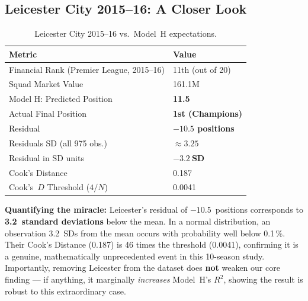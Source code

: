 \documentclass[11pt, a4paper]{article}
\begin{document}
\subsection{Leicester City 2015--16: A Closer Look}

\begin{table}[H]
  \centering
  \small
  \caption{Leicester City 2015--16 vs.\ Model~H expectations.}
  \label{tab:leicester}
  \begin{tabular}{l l}
    \toprule
    \rowcolor{NavyBlue}
    \color{white}\textbf{Metric} &
    \color{white}\textbf{Value} \\
    \midrule
    Financial Rank (Premier League, 2015--16)   & 11th (out of 20) \\
    Squad Market Value                           & \EUR{}161.1M \\
    \rowcolor{RowA}
    Model H: Predicted Position                 & \textbf{11.5} \\
    Actual Final Position                       & \textbf{1st (Champions)} \\
    \rowcolor{RowB}
    Residual                                    & \textbf{$-10.5$ positions} \\
    Residuals SD (all 975 obs.)                 & $\approx 3.25$ \\
    Residual in SD units                        & $\mathbf{-3.2\ \text{SD}}$ \\
    \rowcolor{RowA}
    Cook's Distance                             & 0.187 \\
    Cook's~$D$ Threshold ($4/N$)                & 0.0041 \\
    \bottomrule
  \end{tabular}
\end{table}

\begin{alertbox}
  \textbf{Quantifying the miracle:} Leicester's residual of $-10.5$~positions
  corresponds to \textbf{3.2~standard deviations} below the mean. In a normal
  distribution, an observation 3.2~SDs from the mean occurs with probability
  well below 0.1\,\%. Their Cook's Distance (0.187) is 46 times the threshold
  (0.0041), confirming it is a genuine, mathematically unprecedented event in
  this 10-season study. Importantly, removing Leicester from the dataset does
  \textbf{not} weaken our core finding --- if anything, it marginally
  \emph{increases} Model~H's $R^{2}$, showing the result is robust to this
  extraordinary case.
\end{alertbox}
\end{document}
